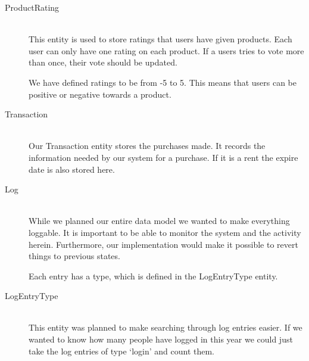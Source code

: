 \begin{description}
\item[ProductRating] \hfill \\
This entity is used to store ratings that users have given products. Each user can only have one rating on each product. If a users tries to vote more than once, their vote should be updated.

We have defined ratings to be from -5 to 5. This means that users can be positive or negative towards a product.

\item[Transaction] \hfill \\
Our Transaction entity stores the purchases made. It records the information needed by our system for a purchase. If it is a rent the expire date is also stored here.

\item[Log] \hfill \\
While we planned our entire data model we wanted to make everything loggable. It is important to be able to monitor the system and the activity herein. Furthermore, our implementation would make it possible to revert things to previous states.

Each entry has a type, which is defined in the LogEntryType entity.

\item[LogEntryType] \hfill \\
This entity was planned to make searching through log entries easier. If we wanted to know how many people have logged in this year we could just take the log entries of type `login' and count them.
\end{description}